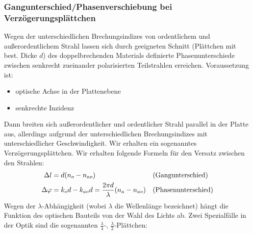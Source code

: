 \subsubsection[Gangunterschied]%
{Gangunterschied/Phasenverschiebung bei Verzögerungsplättchen}
Wegen der unterschiedlichen Brechungsindizes von ordentlichem und
außerordentlichem Strahl lassen sich durch geeigneten Schnitt
(Plättchen mit best. Dicke $d$) des
doppelbrechenden Materials definierte Phasenunterschiede zwischen
senkrecht zueinander polarisierten Teilstrahlen erreichen.
Voraussetzung ist:
\begin{itemize}
\item optische Achse in der Plattenebene
\item senkrechte Inzidenz
\end{itemize}
Dann breiten sich außerordentlicher und ordentlicher Strahl parallel
in der Platte aus, allerdings aufgrund der unterschiedlichen
Brechungsindizes mit unterschiedlicher Geschwindigkeit. Wir erhalten
ein sogenanntes Verzögerungsplättchen.
Wir erhalten folgende Formeln für den Versatz zwischen den Strahlen:
\begin{align*}
  \Delta l &= d(n_o-n_{ao}) 
  &&\text{(Gangunterschied\index{Doppelbrechung!Gangunterschied})}\\
  \Delta\varphi &= k_od - k_{ao}d = \frac{2\pi d}{\lambda}(n_a-n_{ao})
  &&\text{(Phasenunterschied\index{Doppelbrechung!Phasenunterschied})}
\end{align*}
Wegen der $\lambda$-Abhängigkeit (wobei $\lambda$ die Wellenlänge
bezeichnet) hängt die Funktion des optischen Bauteils von der Wahl des
Lichts ab. Zwei Spezialfälle in der Optik sind die sogenannten
$\frac{\lambda}{4}$-, $\frac{\lambda}{2}$-Plättchen:
